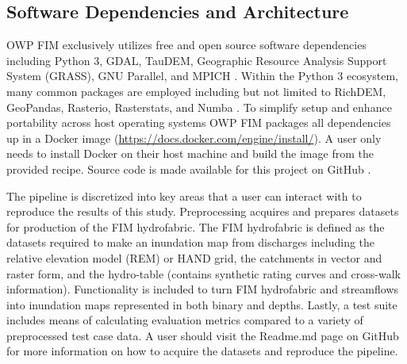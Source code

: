 \documentclass[draft]{dependencies/agujournal2019}
\begin{document}
\subsection{Software Dependencies and Architecture}
%
OWP FIM exclusively utilizes free and open source software dependencies including Python 3, GDAL, TauDEM, Geographic Resource Analysis Support System (GRASS), GNU Parallel, and MPICH \cite{python382,gdal2020,tarboton2005terrain,grass2020,tange2015gnu,amer2021mpich}.
Within the Python 3 ecosystem, many common packages are employed including but not limited to RichDEM, GeoPandas, Rasterio, Rasterstats, and Numba \cite{barnes2018richdem,jordahl2014geopandas,lam2015numba}. 
To simplify setup and enhance portability across host operating systems OWP FIM packages all dependencies up in a Docker image (\url{https://docs.docker.com/engine/install/}). 
A user only needs to install Docker on their host machine and build the image from the provided recipe. 
Source code is made available for this project on GitHub \cite{inundationMapping2022}. 

The pipeline is discretized into key areas that a user can interact with to reproduce the results of this study. 
Preprocessing acquires and prepares datasets for production of the FIM hydrofabric. 
The FIM hydrofabric is defined as the datasets required to make an inundation map from discharges including the relative elevation model (REM) or HAND grid, the catchments in vector and raster form, and the hydro-table (contains synthetic rating curves and cross-walk information).
Functionality is included to turn FIM hydrofabric and streamflows into inundation maps represented in both binary and depths.
Lastly, a test suite includes means of calculating evaluation metrics compared to a variety of preprocessed test case data.
A user should visit the Readme.md page on GitHub for more information on how to acquire the datasets and reproduce the pipeline.
%
\end{document}
